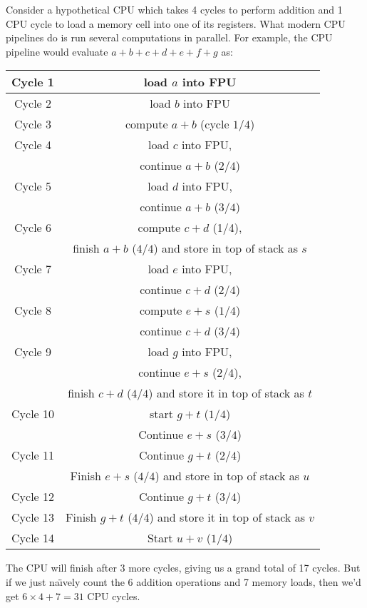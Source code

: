 \begin{ex}
  Consider a hypothetical CPU which takes 4 cycles to perform
  addition and 1 CPU cycle to load a memory cell into one of its
  registers. What modern CPU pipelines do is run several computations in
  parallel. For example, the CPU pipeline would evaluate $a+b+c+d+e+f+g$ as:
  \begin{center}
    \begin{tabular}{c|c}
      Cycle 1  & load $a$ into FPU\\\hline
      Cycle 2  & load $b$ into FPU\\\hline
      Cycle 3  & compute $a+b$ (cycle $1/4$)\\\hline
      Cycle 4  & load $c$ into FPU,\\
               & continue $a+b$ ($2/4$)\\\hline
      Cycle 5  & load $d$ into FPU,\\
               & continue $a+b$ ($3/4$)\\\hline
      Cycle 6  & compute $c+d$ (1/4),\\
               & finish $a+b$ ($4/4$) and store in top of stack as $s$\\\hline
      Cycle 7  & load $e$ into FPU,\\
               & continue $c+d$ ($2/4$)\\\hline
      Cycle 8  & compute $e+s$ ($1/4$)\\
               & continue $c+d$ ($3/4$)\\\hline
      Cycle 9  & load $g$ into FPU,\\
               & continue $e+s$ ($2/4$),\\
               & finish $c+d$ ($4/4$) and store it in top of stack as $t$\\\hline
      Cycle 10 & start $g+t$ ($1/4$)\\
               & Continue $e+s$ ($3/4$)\\\hline
      Cycle 11 & Continue $g+t$ ($2/4$)\\
               & Finish $e+s$ ($4/4$) and store in top of stack as $u$\\\hline
      Cycle 12 & Continue $g+t$ ($3/4$)\\\hline
      Cycle 13 & Finish $g+t$ ($4/4$) and store it in top of stack as $v$\\\hline
      Cycle 14 & Start $u+v$ ($1/4$)
    \end{tabular}
  \end{center}
  The CPU will finish after 3 more cycles, giving us a grand total of 17
  cycles. But if we just na\"{\i}vely count the 6 addition operations
  and 7 memory loads, then we'd get $6\times4 + 7=31$ CPU cycles.
\end{ex}

